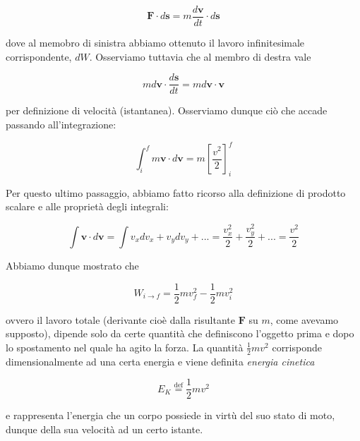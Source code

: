 \[ \mathbf{F} \cdot d\mathbf{s} = m \frac{d\mathbf{v}}{dt} \cdot d\mathbf{s} \]

\noindent dove al memobro di sinistra abbiamo ottenuto il lavoro
infinitesimale corrispondente, $dW$. Osserviamo tuttavia che
al membro di destra vale

\[ m d\mathbf{v} \cdot \frac{d\mathbf{s}}{dt} = m d\mathbf{v} \cdot \mathbf{v} \]

\noindent per definizione di velocità (istantanea). Osserviamo
dunque ciò che accade passando all'integrazione:

\[ \int_{i}^{f} m \mathbf{v} \cdot d\mathbf{v} = m \left[\frac{v^2}{2}\right]_{i}^{f} \]

\noindent Per questo ultimo passaggio, abbiamo fatto ricorso alla
definizione di prodotto scalare e alle proprietà degli integrali:

\[ \int \mathbf{v} \cdot d\mathbf{v} = \int v_x dv_x + v_y dv_y + ... = \frac{v_x^2}{2} + \frac{v_y^2}{2} + ... = \frac{v^2}{2} \]

\noindent Abbiamo dunque mostrato che

\[ W_{i \to f} = \frac{1}{2}mv_f^2 - \frac{1}{2}mv_i^2 \]

\noindent ovvero il lavoro totale (derivante cioè dalla risultante
$\mathbf{F}$ su $m$, come avevamo supposto), dipende solo da
certe quantità che definiscono l'oggetto prima e dopo lo spostamento
nel quale ha agito la forza. La quantità $\frac12mv^2$ corrisponde
dimensionalmente ad una certa energia e viene definita
\textit{energia cinetica}

\[ E_K \stackrel{\text{def}}{=} \frac{1}{2}mv^2 \]

\noindent e rappresenta l'energia che un corpo possiede in
virtù del suo stato di moto, dunque della sua velocità ad un
certo istante.



